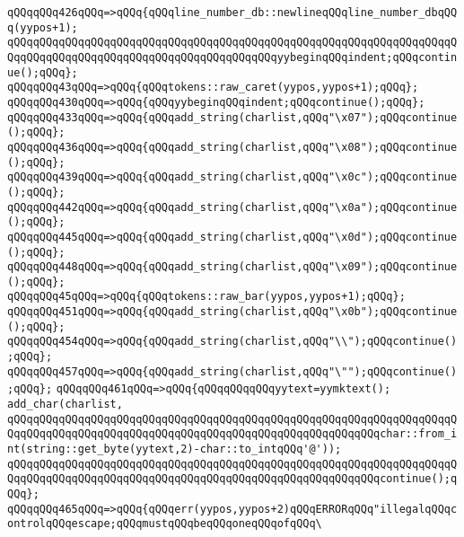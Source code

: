 \verb|qQQqqQQq426qQQq=>qQQq{qQQqline_number_db::newlineqQQqline_number_dbqQQq(yypos+1);|\newline
\verb|qQQqqQQqqQQqqQQqqQQqqQQqqQQqqQQqqQQqqQQqqQQqqQQqqQQqqQQqqQQqqQQqqQQqqQQqqQQqqQQqqQQqqQQqqQQqqQQqqQQqqQQqqQQqqQQqyybeginqQQqindent;qQQqcontinue();qQQq};|\newline
\verb|qQQqqQQq43qQQq=>qQQq{qQQqtokens::raw_caret(yypos,yypos+1);qQQq};|\newline
\verb|qQQqqQQq430qQQq=>qQQq{qQQqyybeginqQQqindent;qQQqcontinue();qQQq};|\newline
\verb|qQQqqQQq433qQQq=>qQQq{qQQqadd_string(charlist,qQQq"\x07");qQQqcontinue();qQQq};|\newline
\verb|qQQqqQQq436qQQq=>qQQq{qQQqadd_string(charlist,qQQq"\x08");qQQqcontinue();qQQq};|\newline
\verb|qQQqqQQq439qQQq=>qQQq{qQQqadd_string(charlist,qQQq"\x0c");qQQqcontinue();qQQq};|\newline
\verb|qQQqqQQq442qQQq=>qQQq{qQQqadd_string(charlist,qQQq"\x0a");qQQqcontinue();qQQq};|\newline
\verb|qQQqqQQq445qQQq=>qQQq{qQQqadd_string(charlist,qQQq"\x0d");qQQqcontinue();qQQq};|\newline
\verb|qQQqqQQq448qQQq=>qQQq{qQQqadd_string(charlist,qQQq"\x09");qQQqcontinue();qQQq};|\newline
\verb|qQQqqQQq45qQQq=>qQQq{qQQqtokens::raw_bar(yypos,yypos+1);qQQq};|\newline
\verb|qQQqqQQq451qQQq=>qQQq{qQQqadd_string(charlist,qQQq"\x0b");qQQqcontinue();qQQq};|\newline
\verb|qQQqqQQq454qQQq=>qQQq{qQQqadd_string(charlist,qQQq"\\");qQQqcontinue();qQQq};|\newline
\verb|qQQqqQQq457qQQq=>qQQq{qQQqadd_string(charlist,qQQq"\"");qQQqcontinue();qQQq};|\newline
\verb|qQQqqQQq461qQQq=>qQQq{qQQqqQQqqQQqyytext=yymktext();|\newline
\verb|add_char(charlist,|\newline
\verb|qQQqqQQqqQQqqQQqqQQqqQQqqQQqqQQqqQQqqQQqqQQqqQQqqQQqqQQqqQQqqQQqqQQqqQQqqQQqqQQqqQQqqQQqqQQqqQQqqQQqqQQqqQQqqQQqqQQqqQQqqQQqqQQqchar::from_int(string::get_byte(yytext,2)-char::to_intqQQq'@'));|\newline
\verb|qQQqqQQqqQQqqQQqqQQqqQQqqQQqqQQqqQQqqQQqqQQqqQQqqQQqqQQqqQQqqQQqqQQqqQQqqQQqqQQqqQQqqQQqqQQqqQQqqQQqqQQqqQQqqQQqqQQqqQQqqQQqqQQqcontinue();qQQq};|\newline
\verb|qQQqqQQq465qQQq=>qQQq{qQQqerr(yypos,yypos+2)qQQqERRORqQQq"illegalqQQqcontrolqQQqescape;qQQqmustqQQqbeqQQqoneqQQqofqQQq\|\newline
